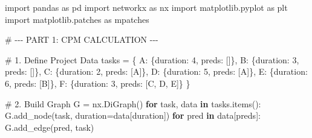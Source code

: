 \documentclass[
  letterpaper,
  DIV=11,
  numbers=noendperiod]{scrreprt}
\newenvironment{Shaded}{\begin{snugshade}}{\end{snugshade}}
\newcommand{\CommentTok}[1]{\textcolor[rgb]{0.37,0.37,0.37}{#1}}
\newcommand{\ControlFlowTok}[1]{\textcolor[rgb]{0.00,0.23,0.31}{\textbf{#1}}}
\newcommand{\DecValTok}[1]{\textcolor[rgb]{0.68,0.00,0.00}{#1}}
\newcommand{\ImportTok}[1]{\textcolor[rgb]{0.00,0.46,0.62}{#1}}
\newcommand{\KeywordTok}[1]{\textcolor[rgb]{0.00,0.23,0.31}{\textbf{#1}}}
\newcommand{\NormalTok}[1]{\textcolor[rgb]{0.00,0.23,0.31}{#1}}
\newcommand{\OperatorTok}[1]{\textcolor[rgb]{0.37,0.37,0.37}{#1}}
\newcommand{\StringTok}[1]{\textcolor[rgb]{0.13,0.47,0.30}{#1}}
\begin{document}
\begin{Shaded}
\begin{Highlighting}[]
\ImportTok{import}\NormalTok{ pandas }\ImportTok{as}\NormalTok{ pd}
\ImportTok{import}\NormalTok{ networkx }\ImportTok{as}\NormalTok{ nx}
\ImportTok{import}\NormalTok{ matplotlib.pyplot }\ImportTok{as}\NormalTok{ plt}
\ImportTok{import}\NormalTok{ matplotlib.patches }\ImportTok{as}\NormalTok{ mpatches}

\CommentTok{\# {-}{-}{-} PART 1: CPM CALCULATION {-}{-}{-}}

\CommentTok{\# 1. Define Project Data}
\NormalTok{tasks }\OperatorTok{=}\NormalTok{ \{}
    \StringTok{\textquotesingle{}A\textquotesingle{}}\NormalTok{: \{}\StringTok{\textquotesingle{}duration\textquotesingle{}}\NormalTok{: }\DecValTok{4}\NormalTok{, }\StringTok{\textquotesingle{}preds\textquotesingle{}}\NormalTok{: []\},}
    \StringTok{\textquotesingle{}B\textquotesingle{}}\NormalTok{: \{}\StringTok{\textquotesingle{}duration\textquotesingle{}}\NormalTok{: }\DecValTok{3}\NormalTok{, }\StringTok{\textquotesingle{}preds\textquotesingle{}}\NormalTok{: []\},}
    \StringTok{\textquotesingle{}C\textquotesingle{}}\NormalTok{: \{}\StringTok{\textquotesingle{}duration\textquotesingle{}}\NormalTok{: }\DecValTok{2}\NormalTok{, }\StringTok{\textquotesingle{}preds\textquotesingle{}}\NormalTok{: [}\StringTok{\textquotesingle{}A\textquotesingle{}}\NormalTok{]\},}
    \StringTok{\textquotesingle{}D\textquotesingle{}}\NormalTok{: \{}\StringTok{\textquotesingle{}duration\textquotesingle{}}\NormalTok{: }\DecValTok{5}\NormalTok{, }\StringTok{\textquotesingle{}preds\textquotesingle{}}\NormalTok{: [}\StringTok{\textquotesingle{}A\textquotesingle{}}\NormalTok{]\},}
    \StringTok{\textquotesingle{}E\textquotesingle{}}\NormalTok{: \{}\StringTok{\textquotesingle{}duration\textquotesingle{}}\NormalTok{: }\DecValTok{6}\NormalTok{, }\StringTok{\textquotesingle{}preds\textquotesingle{}}\NormalTok{: [}\StringTok{\textquotesingle{}B\textquotesingle{}}\NormalTok{]\},}
    \StringTok{\textquotesingle{}F\textquotesingle{}}\NormalTok{: \{}\StringTok{\textquotesingle{}duration\textquotesingle{}}\NormalTok{: }\DecValTok{3}\NormalTok{, }\StringTok{\textquotesingle{}preds\textquotesingle{}}\NormalTok{: [}\StringTok{\textquotesingle{}C\textquotesingle{}}\NormalTok{, }\StringTok{\textquotesingle{}D\textquotesingle{}}\NormalTok{, }\StringTok{\textquotesingle{}E\textquotesingle{}}\NormalTok{]\}}
\NormalTok{\}}

\CommentTok{\# 2. Build Graph}
\NormalTok{G }\OperatorTok{=}\NormalTok{ nx.DiGraph()}
\ControlFlowTok{for}\NormalTok{ task, data }\KeywordTok{in}\NormalTok{ tasks.items():}
\NormalTok{    G.add\_node(task, duration}\OperatorTok{=}\NormalTok{data[}\StringTok{\textquotesingle{}duration\textquotesingle{}}\NormalTok{])}
    \ControlFlowTok{for}\NormalTok{ pred }\KeywordTok{in}\NormalTok{ data[}\StringTok{\textquotesingle{}preds\textquotesingle{}}\NormalTok{]:}
\NormalTok{        G.add\_edge(pred, task)}


\end{Highlighting}
\end{Shaded}
\end{document}
